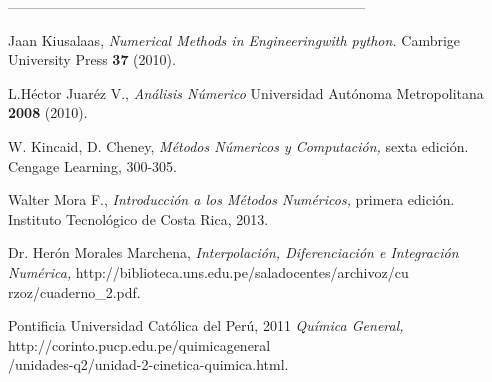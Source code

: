 \documentclass[10pt,a4paper]{article}
\begin{document}
	\begin{center}
		-----------------------------------------------------------------------------
	\end{center}
	\begin{multicols}{2}
		\begin{list}{}{\setlength{\topsep}{0mm}\setlength{\itemsep}{0mm}%
				\setlength{\parsep}{0mm}\setlength{\leftmargin}{4mm}}
			\small
			\item[1.] Jaan Kiusalaas, \textit{Numerical Methods in Engineering\linebreak with python.} Cambrige University Press \textbf{37} (2010).
			\item[2.] L.Héctor Juaréz V., \textit{Análisis Númerico} Universidad Autónoma Metropolitana \textbf{2008} (2010).
			\item[3.] W. Kincaid, D. Cheney, \textit{Métodos Númericos y Computación,} sexta edición. Cengage Learning, 300-305.
			
			\item[4.] Walter Mora F.,
			\textit{Introducción a los Métodos Numéricos,} primera edición. Instituto Tecnológico de Costa Rica, 2013.
			
			\item[5.] Dr. Herón Morales Marchena,
			\textit{Interpolación, Diferenciación e Integración Numérica,} http://biblioteca.uns.edu.pe/saladocentes/archivoz/cu\\rzoz/cuaderno\_2.pdf.
			
			\item[6.] Pontificia Universidad Católica del Perú, 2011
			\textit{Química General,} http://corinto.pucp.edu.pe/quimicageneral\\/unidades-q2/unidad-2-cinetica-quimica.html.
		\end{list}
	\end{multicols}
\end{document}

